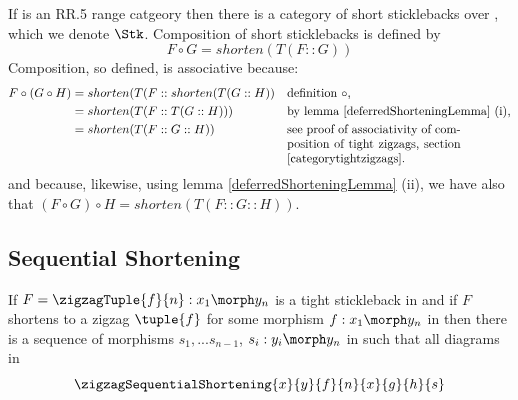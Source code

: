 {If \catcw is an RR.5 range catgeory then
 there is a category of short sticklebacks over \catc, which we denote
 $\Stk$.
Composition of short sticklebacks is defined by
\[
F \circ G = shorten(T(F::G)) 
\]
Composition, so defined, is associative because:
\begin{align*}
F \circ (G \circ H)
  &= shorten(T(F :: shorten(T(G ::H)) && \mbox{definition $\circ$,} \\
  &= shorten (T(F::T(G::H))) && \mbox{by lemma \ref{deferredShorteningLemma} (i),} \\
  &= shorten (T(F::G::H))    && \mbox{\parbox[t]{5cm}{see proof of associativity of composition of tight zigzags, section \ref{categorytightzigzags}.}}
\end{align*}  
and because, likewise, 
using lemma \ref{deferredShorteningLemma} (ii),
we have also that $(F \circ G) \circ H=shorten (T(F::G::H))$.

\subsection{Sequential Shortening}
\begin{lemma}
If $F=\zigzagTuple{f}{n}:x_1 \morph y_n$ 
is a tight stickleback in  \catcw
and if $F$ shortens to a zigzag $\tuple{f}$ for some
morphism $f:x_1 \morph y_n$ in \catcw then  there
is a sequence of morphisms $s_1,...s_{n-1}$,
$s_i: y_i \morph y_n$ in \catcw
such that all diagrams in 
\[
\zigzagSequentialShortening{x}{y}{f}{n}{x}{g}{h}{s}
\]


\end{lemma}}

